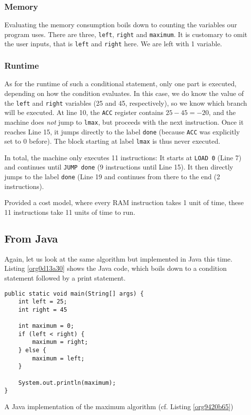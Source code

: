 \documentclass[11pt]{article}
\begin{document}
\subsubsection*{Memory}
\label{sec:orgb3267a2}

Evaluating the memory consumption boils down to counting the variables
our program uses. There are three, \texttt{left}, \texttt{right} and \texttt{maximum}. It
is customary to omit the user inputs, that is \texttt{left} and \texttt{right}
here. We are left with 1 variable.

\subsubsection*{Runtime}
\label{sec:orgc3f9e47}

As for the runtime of such a conditional statement, only one part is
executed, depending on how the condition evaluates. In this case, we
do know the value of the \texttt{left} and \texttt{right} variables (25 and 45,
respectively), so we know which branch will be executed. At line
10, the \texttt{ACC} register contains \(25 - 45 = -20\), and the
machine does \emph{not} jump to \texttt{lmax}, but proceeds with the next
instruction. Once it reaches Line 15, it jumps directly
to the label \texttt{done} (because \texttt{ACC} was explicitly set to 0
before). The block starting at label \texttt{lmax} is thus never executed.

In total, the machine only executes 11 instructions: It starts at
\texttt{LOAD 0} (Line 7) and continues until \texttt{JUMP done} (9
instructions until Line 15). It then directly jumps to
the label \texttt{done} (Line 19 and continues from there to the end
(2 instructions).

Provided a cost model, where every RAM instruction takes 1 unit of time,
these 11 instructions take 11 units of time to run.

\subsection{From Java}
\label{sec:orgcb046f9}

Again, let us look at the same algorithm but implemented in Java this
time. Listing \ref{org0d13a30} shows the Java code, which boils down
to a condition statement followed by a print statement.

\begin{listing}[htbp]
\begin{verbatim}
public static void main(String[] args) {
    int left = 25;
    int right = 45

    int maximum = 0;
    if (left < right) {
        maximum = right;
    } else {
        maximum = left;
    }

    System.out.println(maximum);
}
\end{verbatim}
\caption{\label{org0d13a30}A Java implementation of the maximum algorithm (cf. Listing \ref{org9420b65})}
\end{listing}
\end{document}

